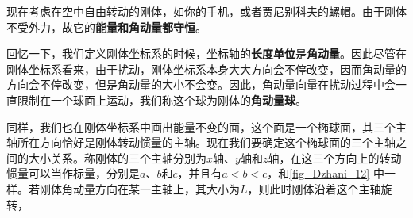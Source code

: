 现在考虑在空中自由转动的刚体，如你的手机，或者贾尼别科夫的螺帽。由于刚体不受外力，故它的\textbf{能量和角动量都守恒}。


回忆一下，我们定义刚体坐标系的时候，坐标轴的\textbf{长度单位}是\textbf{角动量}。因此尽管在刚体坐标系看来，由于扰动，刚体坐标系本身大大方向会不停改变，因而角动量的方向会不停改变，但是角动量的大小不会变。因此，角动量向量在扰动过程中会一直限制在一个球面上运动，我们称这个球为刚体的\textbf{角动量球}。


同样，我们也在刚体坐标系中画出能量不变的面，这个面是一个椭球面，其三个主轴所在方向恰好是刚体转动惯量的主轴。现在我们要确定这个椭球面的三个主轴之间的大小关系。称刚体的三个主轴分别为$x$轴、$y$轴和$z$轴，在这三个方向上的转动惯量可以当作标量，分别是$a$、$b$和$c$，并且有$a<b<c$，和\autoref{fig_Dzhani_12} 中一样。若刚体角动量方向在某一主轴上，其大小为$L$，则此时刚体沿着这个主轴旋转，













